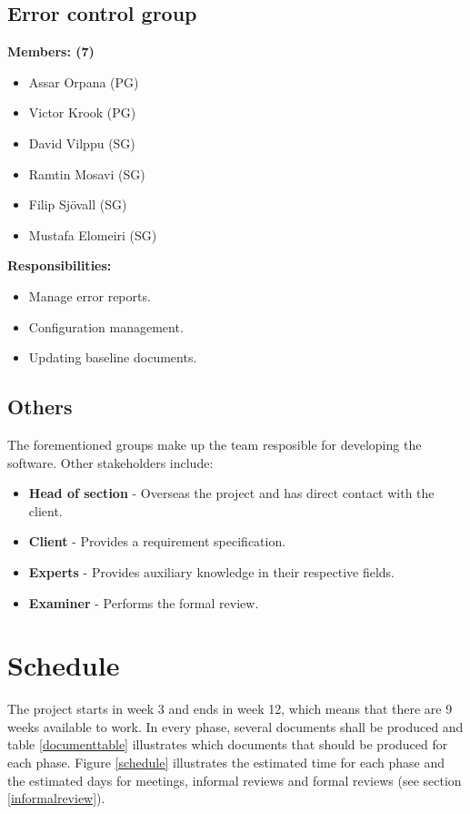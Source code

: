 \documentclass{article}
\begin{document}
    \subsection{Error control group}
        \textbf{Members: (7)}
        \begin{itemize}
            \item Assar Orpana (PG)
            \item Victor Krook (PG)
            \item David Vilppu (SG)
            \item Ramtin Mosavi (SG)
            \item Filip Sjövall (SG)
            \item Mustafa Elomeiri (SG)
        \end{itemize}
        \textbf{Responsibilities: }
        \begin{itemize}
            \item Manage error reports. 
            \item Configuration management. 
            \item Updating baseline documents.  
        \end{itemize}

    \subsection{Others}
        The forementioned groups make up the team resposible for developing the software. Other stakeholders include:
        \begin{itemize}
            \item \textbf{Head of section} - Overseas the project and has direct contact with the client. 
            \item \textbf{Client} - Provides a requirement specification.
            \item \textbf{Experts} - Provides auxiliary knowledge in their respective fields.
            \item \textbf{Examiner} - Performs the formal review.
        \end{itemize}

\section{Schedule}
    The project starts in week 3 and ends in week 12, which means that
    there are 9 weeks available to work. In every phase, several documents shall be produced and table \ref{documenttable} illustrates which documents that should be produced for each phase. Figure \ref{schedule} illustrates the estimated time for each phase and the estimated days for meetings, informal reviews and formal reviews (see section \ref{informalreview}).
    
\end{document}
